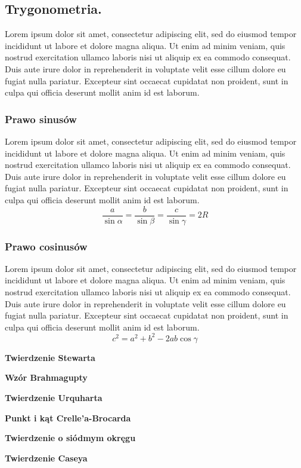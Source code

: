 \subsection{Trygonometria.} Lorem ipsum dolor sit amet, consectetur adipiscing elit, sed do eiusmod tempor incididunt ut labore et dolore magna aliqua. Ut enim ad minim veniam, quis nostrud exercitation ullamco laboris nisi ut aliquip ex ea commodo consequat. Duis aute irure dolor in reprehenderit in voluptate velit esse cillum dolore eu fugiat nulla pariatur. Excepteur sint occaecat cupidatat non proident, sunt in culpa qui officia deserunt mollit anim id est laborum.
\subsubsection{Prawo sinusów}
Lorem ipsum dolor sit amet, consectetur adipiscing elit, sed do eiusmod tempor incididunt ut labore et dolore magna aliqua. Ut enim ad minim veniam, quis nostrud exercitation ullamco laboris nisi ut aliquip ex ea commodo consequat. Duis aute irure dolor in reprehenderit in voluptate velit esse cillum dolore eu fugiat nulla pariatur. Excepteur sint occaecat cupidatat non proident, sunt in culpa qui officia deserunt mollit anim id est laborum.
$$\frac{a}{\sin \alpha} = \frac{b}{\sin \beta} = \frac{c}{\sin \gamma} = 2R$$

\subsubsection{Prawo cosinusów}
Lorem ipsum dolor sit amet, consectetur adipiscing elit, sed do eiusmod tempor incididunt ut labore et dolore magna aliqua. Ut enim ad minim veniam, quis nostrud exercitation ullamco laboris nisi ut aliquip ex ea commodo consequat. Duis aute irure dolor in reprehenderit in voluptate velit esse cillum dolore eu fugiat nulla pariatur. Excepteur sint occaecat cupidatat non proident, sunt in culpa qui officia deserunt mollit anim id est laborum.
$$c^2 = a^2 + b^2 - 2ab \cos \gamma$$

\textbf{Twierdzenie Stewarta}

\textbf{Wzór Brahmagupty}

\textbf{Twierdzenie Urquharta}

\textbf{Punkt i kąt Crelle'a-Brocarda}

\textbf{Twierdzenie o siódmym okręgu}

\textbf{Twierdzenie Caseya}

